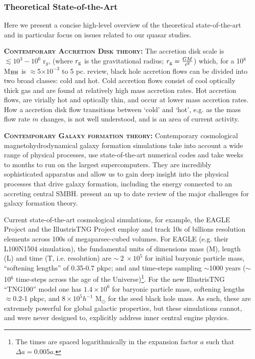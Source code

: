 \subsubsection{Theoretical State-of-the-Art}
Here we present a concise high-level overview of the theoretical
state-of-the-art and in particular focus on issues related to our
quasar studies.

\smallskip 
\smallskip
\noindent 
\textbf{\textsc{Contemporary Accretion Disk theory:}} 
The accretion disk scale is $\lesssim 10^{3}-10^{6}$ r$_{g}$, (where
$r_{\rm g}$ is the gravitational radius; $r_{\rm g}=\frac{GM}{c^2}$)
which, for a 10$^{8}$ M$_{\rm BH}$ is $\approx$5$\times$$10^{-3}$ to 5
pc.  \citet{YuanNarayan2014} review, black hole accretion flows can be
divided into two broad classes: cold and hot. Cold accretion flows
consist of cool optically thick gas and are found at relatively high
mass accretion rates.  Hot accretion flows, are virially hot and
optically thin, and occur at lower mass accretion rates.  How a
accretion disk flow transitions between `cold' and `hot', e.g. as the
mass flow rate $\dot{m}$ changes, is not well understood, and is an
area of current activity.


\smallskip 
\smallskip
\noindent 
\textbf{\textsc{Contemporary Galaxy formation theory:}}
Contemporary cosmological magnetohydrodynamical galaxy formation
simulations take into account a wide range of physical processes, use
state-of-the-art numerical codes and take weeks to months to run on
the largest supercomputers.  They are incredibly sophisticated
apparatus and allow us to gain deep insight into the physical
processes that drive galaxy formation, including the energy connected
to an accreting central SMBH. \citet{NaabOstriker2017} present an up
to date review of the major challenges for galaxy formation theory.

\smallskip 
\smallskip
\noindent 
Current state-of-the-art cosmological simulations, for example, the
EAGLE Project \citep{Schaye2015, Crain2015} and the IllustrisTNG
Project \citep{Pillepich2018} employ and track 10s of billions
resolution elements across 100s of megaparsec-cubed volumes.  For
EAGLE (e.g. their L100N1504 simulation), the fundamental units of
dimensions mass (M), length (L) and time (T, i.e. resolution) are
$\sim~2~\times10^{5}$ for initial baryonic particle mass, ``softening
lengths'' of 0.35-0.7 pkpc; and and time-steps sampling $\sim$1000
years ($\sim$10$^{6}$ time-steps across the age of the
Universe)\footnote{The times are spaced logarithmically in the
expansion factor $a$ such that $\Delta a = 0.005a$.}. For the new
IllustrisTNG ``TNG100'' model one has $1.4\times10^{6}$ for baryonic
particle mass, softening lengths $\approx$0.2-1 pkpc, and
$8\times10^{5} h^{-1}$ M$_{\odot}$ for the seed black hole mass.  As
such, these are extremely powerful for global galactic properties, but
these simulations cannot, and were never designed to, explicitly
address inner central engine physics.

